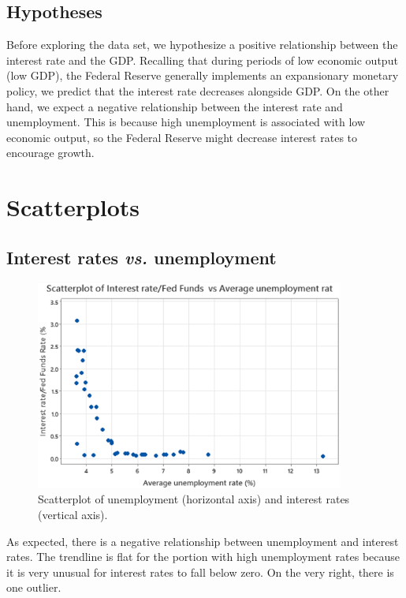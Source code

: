 \documentclass[12pt]{article}
\begin{document}
\subsection{Hypotheses}
Before exploring the data set, we hypothesize a positive relationship between the interest rate and the GDP. Recalling that during periods of low economic output (low GDP), the Federal Reserve generally implements an expansionary monetary policy, we predict that the interest rate decreases alongside GDP. On the other hand, we expect a negative relationship between the interest rate and unemployment. This is because high unemployment is associated with low economic output, so the Federal Reserve might decrease interest rates to encourage growth.

\section{Scatterplots}
\subsection{Interest rates \emph{vs.} unemployment}
\begin{figure}[ht]
\begin{center}
\includegraphics[width=4in]{images/unemployment-scatterplot.png}
\end{center}
\caption{Scatterplot of unemployment (horizontal axis) and interest rates (vertical axis). \label{fig:unemploymentscatterplot}}
\end{figure}
As expected, there is a negative relationship between unemployment and interest rates. The trendline is flat for the portion with high unemployment rates because it is very unusual for interest rates to fall below zero. On the very right, there is one outlier.
\end{document}
